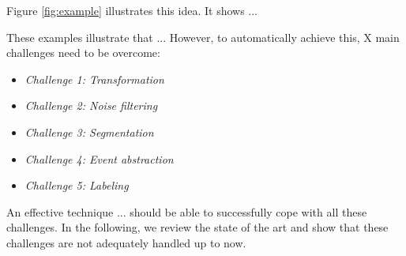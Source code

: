 Figure \ref{fig:example} illustrates this idea. It shows ... 

These examples illustrate that ...  However, to automatically achieve this, X main challenges need to be overcome: 

\begin{itemize}
\item \textit{Challenge 1: Transformation}
\item \textit{Challenge 2: Noise filtering}
\item \textit{Challenge 3: Segmentation}
\item \textit{Challenge 4: Event abstraction}
\item \textit{Challenge 5: Labeling}
 
\end{itemize}

An effective technique ... should be able to successfully cope with all these challenges. In the following, we review the state of the art and show that these challenges are not adequately handled up to now.